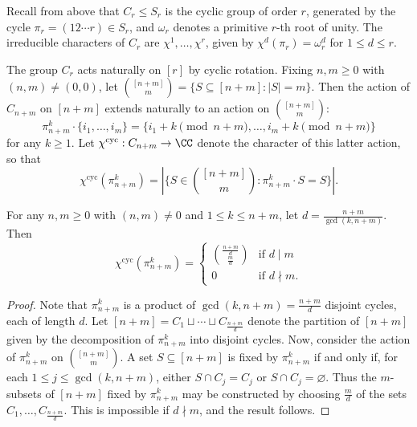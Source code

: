 Recall from above that $C_r \le S_r$ is the cyclic group of order $r$, generated by the cycle $\pi_r = (1 2 \cdots r) \in S_r$, and $\omega_r$ denotes a primitive $r$-th root of unity. The irreducible characters of $C_r$ are $\chi^1, \ldots, \chi^r$, given by $\chi^d(\pi_r) = \omega_r^d$ for $1 \le d \le r$.

The group $C_r$ acts naturally on $[r]$ by cyclic rotation. Fixing $n,m \ge 0$ with $(n,m) \neq (0,0)$, let $\binom{[n+m]}{m} = \{ S \subseteq [n+m] : |S| = m \}$. Then the action of $C_{n+m}$ on $[n+m]$ extends naturally to an action on $\binom{[n+m]}{m}$:
\[
\pi_{n+m}^k \cdot \{ i_1, \ldots, i_m \} = \{ i_1 + k\pmod{n+m}, \ldots, i_m + k\pmod{n+m} \}
\]
for any $k \ge 1$. Let $\chi^\mathrm{cyc} : C_{n+m} \to \CC$ denote the character of this latter action, so that
\[
\chi^\mathrm{cyc}(\pi_{n+m}^k) = |\{ S \in \binom{[n+m]}{m} : \pi_{n+m}^k \cdot S = S \}|.
\]

\begin{lemma}\label{cyc-char}
For any $n,m \ge 0$ with $(n,m) \neq 0$ and $1 \le k \le n+m$, let $d = \frac{n+m}{\gcd(k,n+m)}$. Then
\[
\chi^\mathrm{cyc}(\pi_{n+m}^k) = \begin{cases}
\binom{\frac{n+m}{d}}{\frac{m}{d}} & \text{if } d \mid m \\
0 & \text{if } d \nmid m.
\end{cases}
\]
\end{lemma}
\begin{proof}
Note that $\pi_{n+m}^k$ is a product of $\gcd(k,n+m) = \frac{n+m}{d}$ disjoint cycles, each of length $d$. Let $[n+m] = C_1 \sqcup \cdots \sqcup C_{\frac{n+m}{d}}$ denote the partition of $[n+m]$ given by the decomposition of $\pi_{n+m}^k$ into disjoint cycles. Now, consider the action of $\pi_{n+m}^k$ on $\binom{[n+m]}{m}$. A set $S \subseteq [n+m]$ is fixed by $\pi_{n+m}^k$ if and only if, for each $1 \le j \le \gcd(k,n+m)$, either $S \cap C_j = C_j$ or $S \cap C_j = \varnothing$. Thus the $m$-subsets of $[n+m]$ fixed by $\pi_{n+m}^k$ may be constructed by choosing $\frac{m}{d}$ of the sets $C_1,\ldots,C_{\frac{n+m}{d}}$. This is impossible if $d \nmid m$, and the result follows.
\end{proof}


